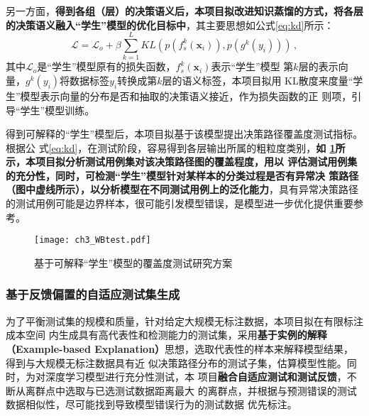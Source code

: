 另一方面，\textbf{得到各组（层）的决策语义后，本项目拟改进知识蒸馏的方式，将各层
的决策语义融入``学生''模型的优化目标中}，其主要思想如公式\eqref{eq:kd}所示：
\begin{equation}
    \mathcal{L} = \mathcal{L}_o + \beta\sum_{k=1}^L KL(p(f_s^k(\bm x_i)), p(g^k(y_i))) \,,
    \label{eq:kd}
\end{equation}
其中$\mathcal L_o$是``学生''模型原有的损失函数，$f_s^k(\bm x_i)$表示``学生''模型
第$k$层的表示向量，$g^k(y_i)$将数据标签$y_i$转换成第$k$层的语义标签，本项目拟用
KL散度来度量``学生''模型表示向量的分布是否和抽取的决策语义接近，作为损失函数的正
则项，引导``学生''模型训练。

得到可解释的``学生''模型后，本项目拟基于该模型提出决策路径覆盖度测试指标。根据公
式\eqref{eq:kd}，在测试阶段，容易得到各层输出所属的粗粒度类别，\textbf{如
\cref{fig:ch3:WBtest}所示，本项目拟分析测试用例集对该决策路径图的覆盖程度，用以
评估测试用例集的充分性，同时，可检测``学生''模型针对某样本的分类过程是否有异常决
策路径（图中虚线所示），以分析模型在不同测试用例上的泛化能力}，具有异常决策路径
的测试用例可能是边界样本，很可能引发模型错误，是模型进一步优化提供重要参考。
\begin{figure}[htp]
    \begin{small}
        \begin{center}
            \texttt{[image: ch3\_WBtest.pdf]}
        \end{center}
        \caption{基于可解释``学生''模型的覆盖度测试研究方案}
        \label{fig:ch3:WBtest}
    \end{small}
\end{figure}

\subsubsection{基于反馈偏置的自适应测试集生成}\label{ch3_3}

为了平衡测试集的规模和质量，针对给定大规模无标注数据，本项目拟在有限标注成本空间
内生成具有高代表性和检测能力的测试集，采用\textbf{基于实例的解释（Example-based
Explanation）}思想，选取代表性的样本来解释模型结果，得到与大规模无标注数据具有近
似决策路径分布的测试子集，估算模型性能。同时，为对深度学习模型进行充分性测试，本
项目\textbf{融合自适应测试和测试反馈}，不断从离群点中选取与已选测试数据距离最大
的离群点，并根据与预测错误的测试数据相似性，尽可能找到导致模型错误行为的测试数据
优先标注。



